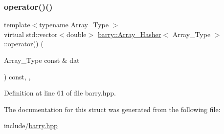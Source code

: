 \subsubsection{\texorpdfstring{operator()()}{operator()()}}
{\footnotesize\ttfamily template$<$typename Array\+\_\+\+Type $>$ \\
virtual std\+::vector$<$double$>$ \hyperlink{structbarry_1_1_array___hasher}{barry\+::\+Array\+\_\+\+Hasher}$<$ Array\+\_\+\+Type $>$\+::operator() (\begin{DoxyParamCaption}\item[{Array\+\_\+\+Type const \&}]{dat }\end{DoxyParamCaption}) const\hspace{0.3cm}{\ttfamily [inline]}, {\ttfamily [virtual]}, {\ttfamily [noexcept]}}



Definition at line 61 of file barry.\+hpp.



The documentation for this struct was generated from the following file\+:\begin{DoxyCompactItemize}
\item 
include/\hyperlink{barry_8hpp}{barry.\+hpp}\end{DoxyCompactItemize}
